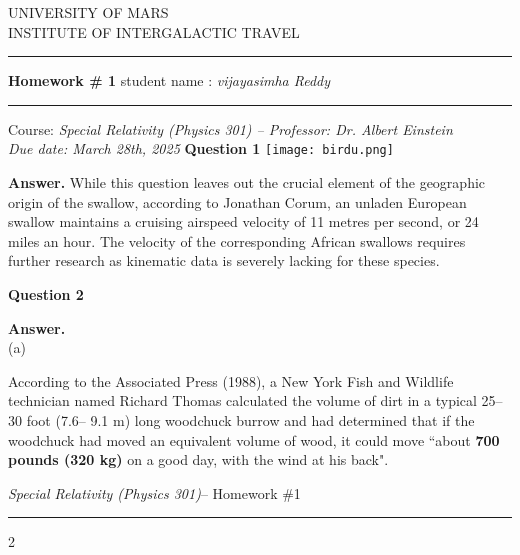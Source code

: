 \documentclass[13pt , a4paper]{article}
\def \v{\vskip3mm}
\begin{document}
\begin{center}
\Large{UNIVERSITY OF MARS \\
INSTITUTE OF INTERGALACTIC TRAVEL}

\vskip3mm
\hrule
\v
\Huge{\textbf{Homework \# 1}}
\v
\small{student name : \textit{vijayasimha Reddy}}
\v
\hrule
\v
Course:\textit{ Special Relativity (Physics 301) – Professor: Dr. Albert Einstein \\
Due date: March 28th, 2025}
\vskip15mm
\Large{\textbf{Question 1}}
\vskip8mm
\v
\texttt{[image: birdu.png]}
\v
\end{center}
\begin{addmargin}
\textbf{Answer.} While this question leaves out the crucial element of the geographic origin of
the swallow, according to Jonathan Corum, an unladen European swallow maintains
a cruising airspeed velocity of 11 metres per second, or 24 miles an hour. The velocity
of the corresponding African swallows requires further research as kinematic data is
severely lacking for these species.
\end{addmargin}
\begin{center}
    \Large{\textbf{Question 2}}
    \vskip8mm
\end{center}
\textbf{Answer.}\\
(a)
\begin{enumerate}
\vskip-6mm
According to the Associated Press (1988), a New York Fish and Wildlife technician
named Richard Thomas calculated the volume of dirt in a typical 25–30 foot (7.6–
9.1 m) long woodchuck burrow and had determined that if the woodchuck had
moved an equivalent volume of wood, it could move “about\textbf{ 700 pounds (320 kg)}
on a good day, with the wind at his back".
\end{enumerate}
\newpage
\vskip5mm
\textit{Special Relativity (Physics 301)}– Homework \#1
\vskip1mm
\hrule
\begin{flushright}
\vskip-0.7cm
2
\end{flushright}
\end{document}
